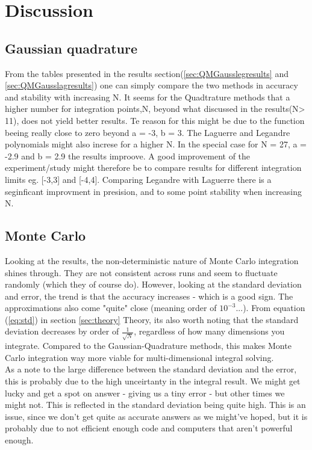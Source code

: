 \documentclass[../main.tex]{subfiles}
\begin{document}
\section{Discussion}
\subsection{Gaussian quadrature}
From the tables presented in the results section(\ref{sec:QMGausslegresults} and \ref{sec:QMGausslagresults}) one can simply compare the two methods in accuracy and stability with increasing N. It seems for the Quadtrature methods that a higher number for integration points,N, beyond what discussed in the results(N> 11), does not yield better results. Te reason for this might be due to the function beeing really close to zero beyond a  = -3, b = 3. The Laguerre and Legandre polynomials might also increse for a higher N. In the special case for N = 27, a = -2.9 and b = 2.9 the results improove. A good improvement of the experiment/study might therefore be to compare results for different integration limits eg. [-3,3] and [-4,4].
Comparing Legandre with Laguerre there is a seginficant improvment in presision, and to some point stability when increasing N.

\subsection{Monte Carlo}
Looking at the results, the non-deterministic nature of Monte Carlo integration shines through. They are not consistent across runs and seem to fluctuate randomly (which they of course do). However, looking at the standard deviation and error, the trend is that the accuracy increases - which is a good sign. The approximations also come "quite" close (meaning order of $10^{-3}$...). From equation (\ref{eq:std}) in section \ref{sec:theory} Theory, its also worth noting that the standard deviation decreases by order of $\frac{1}{\sqrt{N}}$, regardless of how many dimensions you integrate. Compared to the Gaussian-Quadrature methods, this makes Monte Carlo integration way more viable for multi-dimensional integral solving. \\

As a note to the large difference between the standard deviation and the error, this is probably due to the high unceirtanty in the integral result. We might get lucky and get a spot on answer - giving us a tiny error - but other times we might not. This is reflected in the standard deviation being quite high. This is an issue, since we don't get quite as accurate answers as we might've hoped, but it is probably due to not efficient enough code and computers that aren't powerful enough.
\end{document}
